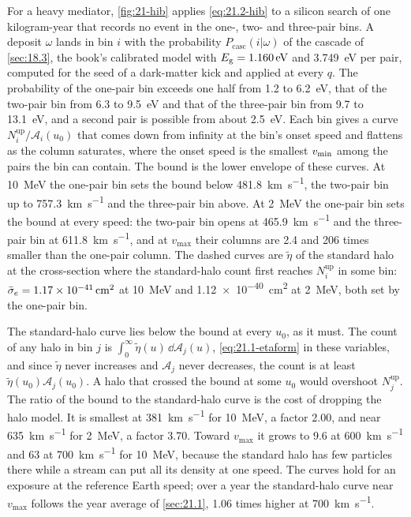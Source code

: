 For a heavy mediator, \cref{fig:21-hib} applies \cref{eq:21.2-hib} to a silicon search of one kilogram-year that records no event in the one-, two- and three-pair bins. A deposit $\omega$ lands in bin $i$ with the probability $P_{\mathrm{casc}}(i|\omega)$ of the cascade of \cref{sec:18.3}, the book's calibrated model with $E_{\mathrm{g}} = \SI{1.160}{eV}$ and \SI{3.749}{eV} per pair, computed for the seed of a dark-matter kick and applied at every $q$. The probability of the one-pair bin exceeds one half from 1.2 to \SI{6.2}{eV}, that of the two-pair bin from 6.3 to \SI{9.5}{eV} and that of the three-pair bin from 9.7 to \SI{13.1}{eV}, and a second pair is possible from about \SI{2.5}{eV}. Each bin gives a curve $N_i^{\mathrm{up}}/\mathcal{A}_i(u_0)$ that comes down from infinity at the bin's onset speed and flattens as the column saturates, where the onset speed is the smallest $v_{\mathrm{min}}$ among the pairs the bin can contain. The bound is the lower envelope of these curves. At \SI{10}{MeV} the one-pair bin sets the bound below \SI{481.8}{km.s^{-1}}, the two-pair bin up to \SI{757.3}{km.s^{-1}} and the three-pair bin above. At \SI{2}{MeV} the one-pair bin sets the bound at every speed: the two-pair bin opens at \SI{465.9}{km.s^{-1}} and the three-pair bin at \SI{611.8}{km.s^{-1}}, and at $v_{\mathrm{max}}$ their columns are 2.4 and 206 times smaller than the one-pair column. The dashed curves are $\tilde\eta$ of the standard halo at the cross-section where the standard-halo count first reaches $N_i^{\mathrm{up}}$ in some bin: $\bar{\sigma}_{e} = \SI{1.17e-41}{cm^2}$ at \SI{10}{MeV} and \SI{1.12e-40}{cm^2} at \SI{2}{MeV}, both set by the one-pair bin.

The standard-halo curve lies below the bound at every $u_0$, as it must. The count of any halo in bin $j$ is $\int_0^\infty\tilde\eta(u)\,\dd\mathcal{A}_j(u)$, \cref{eq:21.1-etaform} in these variables, and since $\tilde\eta$ never increases and $\mathcal{A}_j$ never decreases, the count is at least $\tilde\eta(u_0)\mathcal{A}_j(u_0)$. A halo that crossed the bound at some $u_0$ would overshoot $N_j^{\mathrm{up}}$. The ratio of the bound to the standard-halo curve is the cost of dropping the halo model. It is smallest at \SI{381}{km.s^{-1}} for \SI{10}{MeV}, a factor 2.00, and near \SI{635}{km.s^{-1}} for \SI{2}{MeV}, a factor 3.70. Toward $v_{\mathrm{max}}$ it grows to 9.6 at \SI{600}{km.s^{-1}} and 63 at \SI{700}{km.s^{-1}} for \SI{10}{MeV}, because the standard halo has few particles there while a stream can put all its density at one speed. The curves hold for an exposure at the reference Earth speed; over a year the standard-halo curve near $v_{\mathrm{max}}$ follows the year average of \cref{sec:21.1}, 1.06 times higher at \SI{700}{km.s^{-1}}.

